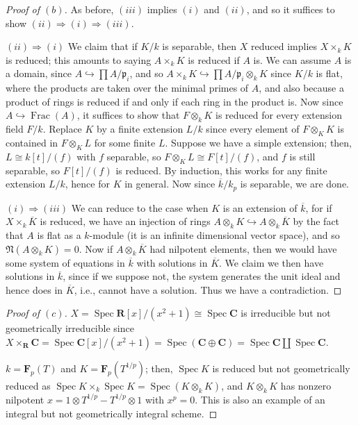 \documentclass[12pt,letterpaper]{article}
\theoremstyle{definition}
\theoremstyle{remark}
\numberwithin{equation}{section}
\numberwithin{figure}{problem}
\DeclareMathOperator{\Spec}{Spec}
\DeclareMathOperator{\Frac}{Frac}
\begin{document}
\begin{proof}[Proof of $(b)$]
  As before, $(iii)$ implies $(i)$ and $(ii)$, and so it suffices to show $(ii) \Rightarrow (i) \Rightarrow (iii)$.
  \par $(ii) \Rightarrow (i)$ We claim that if $K/k$ is separable, then $X$ reduced implies $X \times_k K$ is reduced; this amounts to saying $A \times_k K$ is reduced if $A$ is. We can assume $A$ is a domain, since $A \hookrightarrow \prod A/\mathfrak{p}_i$, and so $A \times_k K \hookrightarrow \prod A/\mathfrak{p}_i \otimes_k K$ since $K/k$ is flat, where the products are taken over the minimal primes of $A$, and also because a product of rings is reduced if and only if each ring in the product is. Now since $A \hookrightarrow \Frac(A)$, it suffices to show that $F \otimes_k K$ is reduced for every extension field $F/k$. Replace $K$ by a finite extension $L/k$ since every element of $F \otimes_K K$ is contained in $F \otimes_K L$ for some finite $L$. Suppose we have a simple extension; then, $L \cong k[t]/(f)$ with $f$ separable, so $F \otimes_K L \cong F[t]/(f)$, and $f$ is still separable, so $F[t]/(f)$ is reduced. By induction, this works for any finite extension $L/k$, hence for $K$ in general. Now since $\overline{k}/k_p$ is separable, we are done.
  \par $(i) \Rightarrow (iii)$ We can reduce to the case when $K$ is an extension of $\overline{k}$, for if $X \times_k \overline{K}$ is reduced, we have an injection of rings $A \otimes_k K \hookrightarrow A \otimes_k \overline{K}$ by the fact that $A$ is flat as a $k$-module (it is an infinite dimensional vector space), and so $\mathfrak{N}(A \otimes_k K) = 0$. Now if $A \otimes_k \overline{K}$ had nilpotent elements, then we would have some system of equations in $\overline{k}$ with solutions in $\overline{K}$. We claim we then have solutions in $\overline{k}$, since if we suppose not, the system generates the unit ideal and hence does in $\overline{K}$, i.e., cannot have a solution. Thus we have a contradiction.
\end{proof}
\begin{proof}[Proof of $(c)$]
  $X = \Spec \mathbf{R}[x]/(x^2+1) \cong \Spec \mathbf{C}$ is irreducible but not geometrically irreducible since $X \times_\mathbf{R} \mathbf{C} = \Spec \mathbf{C}[x]/(x^2+1) = \Spec(\mathbf{C}\oplus\mathbf{C}) = \Spec\mathbf{C}\amalg\Spec\mathbf{C}$.
    \par $k = \mathbf{F}_p(T)$ and $K = \mathbf{F}_p(T^{1/p})$; then, $\Spec K$ is reduced but not geometrically reduced as $\Spec K \times_k \Spec K = \Spec (K \otimes_k K)$, and $K\otimes_k K$ has nonzero nilpotent $x = 1 \otimes T^{1/p} - T^{1/p} \otimes 1$ with $x^p = 0$. This is also an example of an integral but not geometrically integral scheme.
\end{proof}
\end{document}
